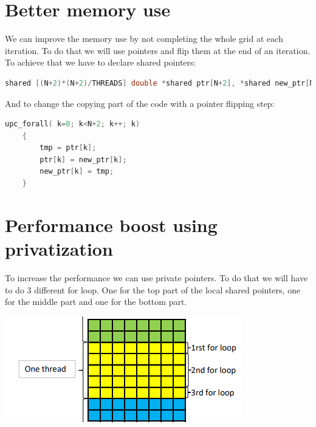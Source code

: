 \documentclass{report}
\begin{document}
\section{Better memory use}

We can improve the memory use by not completing the whole grid at each iteration. To do that we will use pointers and flip them at the end of an iteration.\newline
To achieve that we have to declare shared pointers:
\begin{lstlisting}[language=c]
shared [(N+2)*(N+2)/THREADS] double *shared ptr[N+2], *shared new_ptr[N+2];
\end{lstlisting}
And to change the copying part of the code with a pointer flipping step:

\begin{lstlisting}[language=c]
upc_forall( k=0; k<N+2; k++; k)
    {   
        tmp = ptr[k];
        ptr[k] = new_ptr[k];
        new_ptr[k] = tmp;
    }
\end{lstlisting}

\section{Performance boost using privatization}

To increase the performance we can use private pointers. To do that we will have to do 3 different for loop. One for the top part of the local shared pointers, one for the middle part and one for the bottom part.

\begin{center}
    \includegraphics[scale=1]{Images/for_loop_distribution.png}
    \label{fig6}
\end{center}
\end{document}
